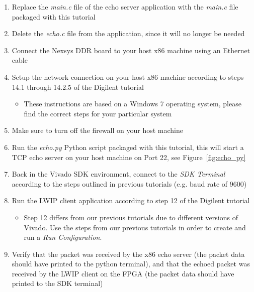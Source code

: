 \documentclass[11pt]{article}
\begin{document}
\begin{enumerate}
    \item Replace the \textit{main.c} file of the echo server application with the \textit{main.c} file packaged with this tutorial
    \item Delete the \textit{echo.c} file from the application, since it will no longer be needed
    \item Connect the Nexsys DDR board to your host x86 machine using an Ethernet cable
    \item Setup the network connection on your host x86 machine according to steps 14.1 through 14.2.5 of the Digilent tutorial
    \begin{itemize}
        \item These instructions are based on a Windows 7 operating system, please find the correct steps for your particular system
    \end{itemize}
    \item Make sure to turn off the firewall on your host machine
    \item Run the \textit{echo.py} Python script packaged with this tutorial, this will start a TCP echo server on your host machine on Port 22, see Figure~\ref{fig:echo_py}
    \item Back in the Vivado SDK environment, connect to the \textit{SDK Terminal} according to the steps outlined in previous tutorials (e.g. baud rate of 9600)
    \item Run the LWIP client application according to step 12 of the Digilent tutorial
    \begin{itemize}
        \item Step 12 differs from our previous tutorials due to different versions of Vivado. Use the steps from our previous tutorials in order to create and run a \textit{Run Configuration}.
    \end{itemize}
    \item Verify that the packet was received by the x86 echo server (the packet data should have printed to the python terminal), and that the echoed packet was received by the LWIP client on the FPGA (the packet data should have printed to the SDK terminal)
\end{enumerate}
\end{document}
